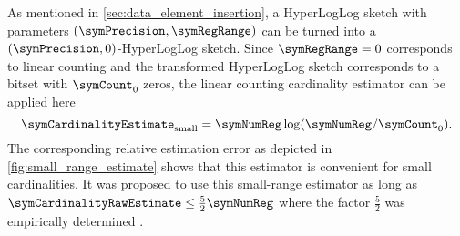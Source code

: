 \documentclass[a4paper]{scrartcl}
\begin{document}
As mentioned in \cref{sec:data_element_insertion}, a HyperLogLog sketch with parameters $(\symPrecision, \symRegRange)$ can be turned into a $(\symPrecision, 0)$-HyperLogLog sketch. Since $\symRegRange=0$ corresponds to linear counting and the transformed HyperLogLog sketch corresponds to a bitset with $\symCount_0$ zeros, the linear counting cardinality estimator \cite{Whang1990} can be applied here
\begin{equation}
\label{equ:small_range_estimate}
\symCardinalityEstimate_\text{small} = \symNumReg \log(\symNumReg/\symCount_0).
\end{equation}
The corresponding relative estimation error as depicted in \cref{fig:small_range_estimate} shows that this estimator is convenient for small cardinalities. It was proposed to use this small-range estimator as long as $\symCardinalityRawEstimate \leq \frac{5}{2}\symNumReg$ where the factor $\frac{5}{2}$ was empirically determined \cite{Flajolet2007}. 
\end{document}
